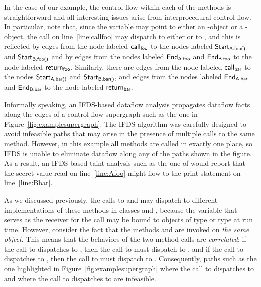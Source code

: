 In the case of our example, the control flow within each of the methods is straightforward and
all interesting issues arise from interprocedural control flow. In particular,
note that, since the variable  may point to either an -object or a -object, 
the call on line~\ref{line:callfoo} may dispatch to either  or to ,
and this is reflected by edges  
  from the node labeled $\textsf{call}_{\textsf{foo}}$ to the nodes labeled
  $\textsf{Start}_{\textsf{A.foo()}}$ and $\textsf{Start}_{\textsf{B.foo()}}$
and by edges
  from the nodes labeled $\textsf{End}_{\textsf{A.foo}}$ and $\textsf{End}_{\textsf{B.foo}}$ 
  to the node labeled  $\textsf{return}_{\textsf{foo}}$.  
Similarly, there are edges from the node labeled $\textsf{call}_{\textsf{bar}}$ to the nodes 
$\textsf{Start}_{\textsf{A.bar()}}$ and $\textsf{Start}_{\textsf{B.bar()}}$, and 
edges
  from the nodes labeled $\textsf{End}_{\textsf{A.bar}}$ and $\textsf{End}_{\textsf{B.bar}}$ 
  to the node labeled  $\textsf{return}_{\textsf{bar}}$. 
 
Informally speaking, an IFDS-based dataflow analysis propagates dataflow facts along the edges
of a control flow supergraph such as the one in Figure~\ref{fig:examplesupergraph}. The
IFDS algorithm was carefully designed to avoid infeasible paths that may arise in the
presence of multiple calls to the same method. However, in this example all methods are
called in exactly one place, so IFDS is unable to eliminate dataflow along any of the
paths shown in the figure. As a result, an IFDS-based taint analysis such as the
one of  would report that the secret value read on line~\ref{line:Afoo}
might flow to the print statement on line~\ref{line:Bbar}. 

As we discussed previously, the calls to  and  may dispatch
to different implementations of these methods in classes  and , 
because the variable  that serves as the receiver for the call may be bound to
 objects of type  or type  at run time. 
However, consider the fact that the methods  and  are invoked
on \textit{the same object}. This means that the behaviors of the two method calls
are \textit{correlated}: if the call to  dispatches to ,
then the call to  must dispatch to , and if the call
to  dispatches to , then the call to  must 
dispatch to .  Consequently, paths such as the one highlighted in
Figure~\ref{fig:examplesupergraph} where the call to  dispatches 
to  and where the call to  dispatches to 
are infeasible.  

